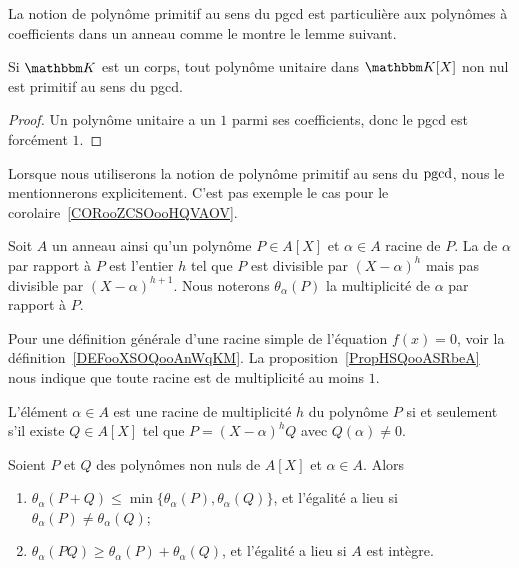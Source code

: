La notion de polynôme primitif au sens du pgcd est particulière aux polynômes à coefficients dans un anneau comme le montre le lemme suivant.

\begin{lemma}
    Si \( \eK\) est un corps, tout polynôme unitaire dans \( \eK[X]\) non nul est primitif au sens du pgcd.
\end{lemma}

\begin{proof}
    Un polynôme unitaire a un \( 1\) parmi ses coefficients, donc le pgcd est forcément \( 1\).
\end{proof}

Lorsque nous utiliserons la notion de polynôme primitif au sens du \( \operatorname{pgcd}\), nous le mentionnerons explicitement. C'est pas exemple le cas pour le corolaire~\ref{CORooZCSOooHQVAOV}.

\begin{definition}
  Soit \( A\) un anneau ainsi qu'un polynôme \( P\in A[X]\) et \( \alpha\in A\) racine de $P$. La  de \( \alpha\) par rapport à \( P\) est l'entier \( h\) tel que \( P\) est divisible par \( (X-\alpha)^h\) mais pas divisible par \( (X-\alpha)^{h+1}\).  Nous noterons \( \theta_{\alpha}(P)\) la multiplicité de \( \alpha\) par rapport à \( P\).
\end{definition}

\begin{normaltext}
    Pour une définition générale d'une racine simple de l'équation \( f(x)=0\), voir la définition~\ref{DEFooXSOQooAnWqKM}. La proposition~\ref{PropHSQooASRbeA} nous indique que toute racine est de multiplicité au moins \( 1\).
\end{normaltext}

\begin{proposition} \label{PropahQQpA}
  L'élément \( \alpha\in A\) est une racine de multiplicité \( h\) du
  polynôme \( P\) si et seulement s'il existe \( Q\in A[X]\) tel que
  \( P=(X-\alpha)^hQ\) avec \( Q(\alpha)\neq 0\).
\end{proposition}

\begin{lemma}       \label{LemIeLhpc}
    Soient \( P\) et \( Q\) des polynômes non nuls de \( A[X]\) et \( \alpha\in A\). Alors
    \begin{enumerate}
        \item
            \( \theta_{\alpha}(P+Q)\leq\min\{
            \theta_{\alpha}(P),\theta_{\alpha}(Q) \}\), et l'égalité a
            lieu si \( \theta_{\alpha}(P)\neq \theta_{\alpha}(Q)\);
        \item     \label{ItemIeLhpciv}
            \( \theta_{\alpha}(PQ)\geq
            \theta_{\alpha}(P)+\theta_{\alpha}(Q)\), et l'égalité a
            lieu si \( A \) est intègre.
    \end{enumerate}
\end{lemma}

